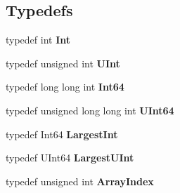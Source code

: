 \subsection*{Typedefs}
\begin{DoxyCompactItemize}
\item 
\mbox{\label{namespace_json_a08122e8005b706d982e48cca1e2119c7}} 
typedef int {\bfseries Int}
\item 
\mbox{\label{namespace_json_a800fb90eb6ee8d5d62b600c06f87f7d4}} 
typedef unsigned int {\bfseries U\+Int}
\item 
\mbox{\label{namespace_json_ab7b47d2905da3b4ae60e4e800ec9ae5f}} 
typedef long long int {\bfseries Int64}
\item 
\mbox{\label{namespace_json_a01f20bce8f8229f38ff890168c0e6452}} 
typedef unsigned long long int {\bfseries U\+Int64}
\item 
\mbox{\label{namespace_json_a218d880af853ce786cd985e82571d297}} 
typedef Int64 {\bfseries Largest\+Int}
\item 
\mbox{\label{namespace_json_ae202ecad69725e23443f465e257456d0}} 
typedef U\+Int64 {\bfseries Largest\+U\+Int}
\item 
\mbox{\label{namespace_json_a8048e741f2177c3b5d9ede4a5b8c53c2}} 
typedef unsigned int {\bfseries Array\+Index}
\end{DoxyCompactItemize}

